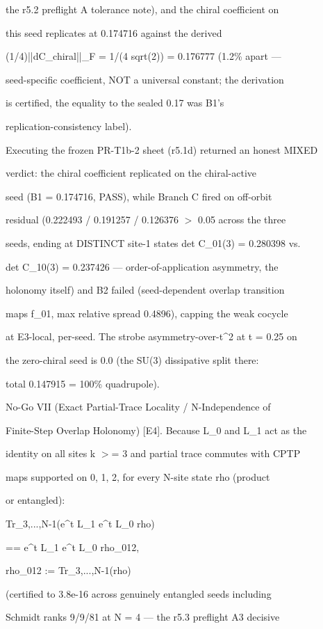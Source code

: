\documentclass[11pt,a4paper]{article}
\theoremstyle{definition}
\begin{document}
the r5.2 preflight A tolerance note), and the chiral coefficient on

this seed replicates at 0.174716 against the derived

(1/4)||dC\_chiral||\_F = 1/(4 sqrt(2)) = 0.176777 (1.2\% apart —

seed-specific coefficient, NOT a universal constant; the derivation

is certified, the equality to the sealed 0.17 was B1's

replication-consistency label).


Executing the frozen PR-T1b-2 sheet (r5.1d) returned an honest MIXED

verdict: the chiral coefficient replicated on the chiral-active

seed (B1 = 0.174716, PASS), while Branch C fired on off-orbit

residual (0.222493 / 0.191257 / 0.126376 $>$ 0.05 across the three

seeds, ending at DISTINCT site-1 states det C\_{01}(3) = 0.280398 vs.

det C\_{10}(3) = 0.237426 — order-of-application asymmetry, the

holonomy itself) and B2 failed (seed-dependent overlap transition

maps f\_{01}, max relative spread 0.4896), capping the weak cocycle

at E3-local, per-seed. The strobe asymmetry-over-t\^{}2 at t = 0.25 on

the zero-chiral seed is 0.0 (the SU(3) dissipative split there:

total 0.147915 = 100\% quadrupole).


No-Go VII (Exact Partial-Trace Locality / N-Independence of

Finite-Step Overlap Holonomy) [E4]. Because L\_0 and L\_1 act as the

identity on all sites k $>$= 3 and partial trace commutes with CPTP

maps supported on {0, 1, 2}, for every N-site state rho (product

or entangled):


    Tr\_{3,...,N-1}(e\^{}{t L\_1} e\^{}{t L\_0} rho)

        == e\^{}{t L\_1} e\^{}{t L\_0} rho\_{012},

    rho\_{012} := Tr\_{3,...,N-1}(rho)


(certified to 3.8e-16 across genuinely entangled seeds including

Schmidt ranks 9/9/81 at N = 4 — the r5.3 preflight A3 decisive
\end{document}
